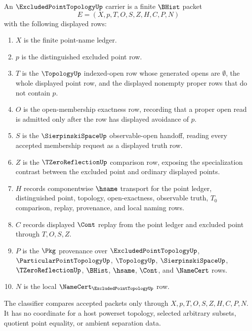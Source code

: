 \begin{definition}
\label{def:excluded-point-topology-carrier}
An $\ExcludedPointTopologyUp$ carrier is a finite $\BHist$ packet
$$
E=(X,p,T,O,S,Z,H,C,P,N)
$$
with the following displayed rows:
\begin{enumerate}
\item $X$ is the finite point-name ledger.
\item $p$ is the distinguished excluded point row.
\item $T$ is the $\TopologyUp$ indexed-open row whose generated opens are $\emptyset$, the whole displayed point row, and the displayed nonempty proper rows that do not contain $p$.
\item $O$ is the open-membership exactness row, recording that a proper open read is admitted only after the row has displayed avoidance of $p$.
\item $S$ is the $\SierpinskiSpaceUp$ observable-open handoff, reading every accepted membership request as a displayed truth row.
\item $Z$ is the $\TZeroReflectionUp$ comparison row, exposing the specialization contrast between the excluded point and ordinary displayed points.
\item $H$ records componentwise $\hsame$ transport for the point ledger, distinguished point, topology, open-exactness, observable truth, $T_0$ comparison, replay, provenance, and local naming rows.
\item $C$ records displayed $\Cont$ replay from the point ledger and excluded point through $T,O,S,Z$.
\item $P$ is the $\Pkg$ provenance over $\ExcludedPointTopologyUp$, $\ParticularPointTopologyUp$, $\TopologyUp$, $\SierpinskiSpaceUp$, $\TZeroReflectionUp$, $\BHist$, $\hsame$, $\Cont$, and $\NameCert$ rows.
\item $N$ is the local $\NameCert_{\ExcludedPointTopologyUp}$ row.
\end{enumerate}
The classifier compares accepted packets only through $X,p,T,O,S,Z,H,C,P,N$. It has no coordinate for a host powerset topology, selected arbitrary subsets, quotient point equality, or ambient separation data.
\end{definition}

